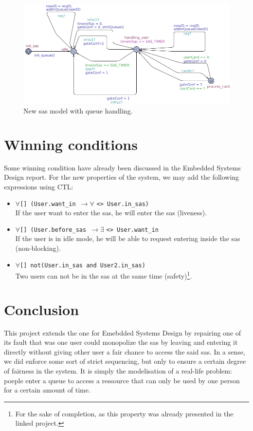 \documentclass[10pt,a4paper]{article}
\begin{document}
\begin{figure}[!h]
	\centering
    \includegraphics[width=\textwidth]{sasModel}
    \caption{New sas model with queue handling.}
    \label{fig:sasModel}
\end{figure}


\section{Winning conditions}
Some winning condition have already been discussed in the Embedded Systems Design report.
For the new properties of the system, we may add the following expressions using \textsc{CTL}:
\begin{itemize}
	\item $\forall$\verb|[] (User.want_in |$\rightarrow \forall$ \verb|<> User.in_sas)| ~\\
		If the user want to enter the sas, he will enter the sas (liveness).
	\item $\forall$\verb|[] (User.before_sas |$\rightarrow \exists$ \verb|<> User.want_in| ~\\
		If the user is in idle mode, he will be able to request entering inside the sas (non-blocking).
	\item $\forall$\verb|[] not(User.in_sas and User2.in_sas)| ~\\
		Two users can not be in the sas at the same time (safety)\footnote{For the sake of completion, as this property was already presented in the linked project.}.
\end{itemize}

\section{Conclusion}
This project extends the one for Emebdded Systems Design by repairing one of its fault that was one user could monopolize the sas by leaving and entering it directly without giving other user a fair chance to access the said sas.
In a sense, we did enforce some sort of strict sequencing, but only to ensure a certain degree of fairness in the system. 
It is simply the modelisation of a real-life problem: poeple enter a queue to access a ressource that can only be used by one person for a certain amount of time.
\end{document}

